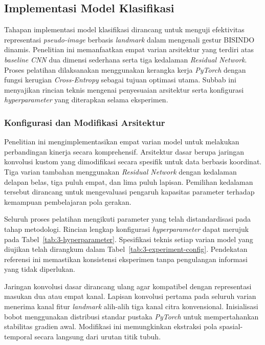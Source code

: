 \subsection{Implementasi Model Klasifikasi}
\label{subsec:implementasi-model}
Tahapan implementasi model klasifikasi dirancang untuk menguji efektivitas representasi \textit{pseudo-image} berbasis \textit{landmark} dalam mengenali gestur BISINDO dinamis.
Penelitian ini memanfaatkan empat varian arsitektur yang terdiri atas \textit{baseline} \textit{CNN} dua dimensi sederhana serta tiga kedalaman \textit{Residual Network}.
Proses pelatihan dilaksanakan menggunakan kerangka kerja \textit{PyTorch} dengan fungsi kerugian \textit{Cross-Entropy} sebagai tujuan optimasi utama.
Subbab ini menyajikan rincian teknis mengenai penyesuaian arsitektur serta konfigurasi \textit{hyperparameter} yang diterapkan selama eksperimen.

\subsubsection{Konfigurasi dan Modifikasi Arsitektur}
\label{subsubsec:konfigurasi-arsitektur}

Penelitian ini mengimplementasikan empat varian model untuk melakukan perbandingan kinerja secara komprehensif.
Arsitektur dasar berupa jaringan konvolusi kustom yang dimodifikasi secara spesifik untuk data berbasis koordinat.
Tiga varian tambahan menggunakan \textit{Residual Network} dengan kedalaman delapan belas, tiga puluh empat, dan lima puluh lapisan.
Pemilihan kedalaman tersebut dirancang untuk mengevaluasi pengaruh kapasitas parameter terhadap kemampuan pembelajaran pola gerakan.

Seluruh proses pelatihan mengikuti parameter yang telah distandardisasi pada tahap metodologi.
Rincian lengkap konfigurasi \textit{hyperparameter} dapat merujuk pada Tabel~\ref{tab:3-hyperparameter}.
Spesifikasi teknis setiap varian model yang diujikan telah dirangkum dalam Tabel~\ref{tab:3-experiment-config}.
Pendekatan referensi ini memastikan konsistensi eksperimen tanpa pengulangan informasi yang tidak diperlukan.

Jaringan konvolusi dasar dirancang ulang agar kompatibel dengan representasi masukan dua atau empat kanal.
Lapisan konvolusi pertama pada seluruh varian menerima kanal fitur \textit{landmark} alih-alih tiga kanal citra konvensional.
Inisialisasi bobot menggunakan distribusi standar pustaka \textit{PyTorch} untuk mempertahankan stabilitas gradien awal.
Modifikasi ini memungkinkan ekstraksi pola spasial-temporal secara langsung dari urutan titik tubuh.

